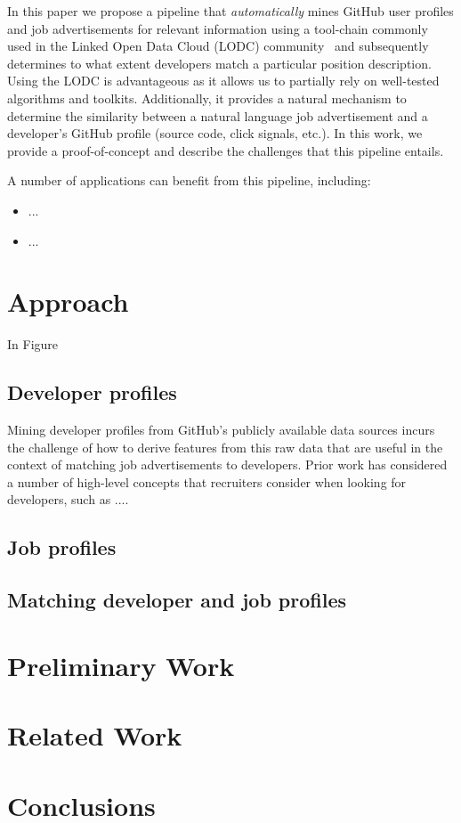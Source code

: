\documentclass[conference]{IEEEtran}
\begin{document}
In this paper we propose a pipeline that \emph{automatically} mines GitHub user profiles and job advertisements for relevant information using a tool-chain commonly used in the Linked Open Data Cloud (LODC) community~\cite{bizer2009linked} and subsequently determines to what extent developers match a particular position description. Using the LODC is advantageous as it allows us to partially rely on well-tested algorithms and toolkits. Additionally, it provides a natural mechanism to determine the similarity between a natural language job advertisement and a developer's GitHub profile (source code, click signals, etc.). In this work, we provide a proof-of-concept and describe the challenges that this pipeline entails.

A number of applications can benefit from this pipeline, including:
\begin{itemize}
\item ...
\item ...
\end{itemize}



\section{Approach}

In Figure


\subsection{Developer profiles}

Mining developer profiles from GitHub's publicly available data sources incurs the challenge of how to derive features from this raw data that are useful in the context of matching job advertisements to developers. Prior work has considered a number of high-level concepts that recruiters consider when looking for developers, such as ....

\subsection{Job profiles}

\subsection{Matching developer and job profiles}


\section{Preliminary Work}

\section{Related Work}

\section{Conclusions}



\end{document}
